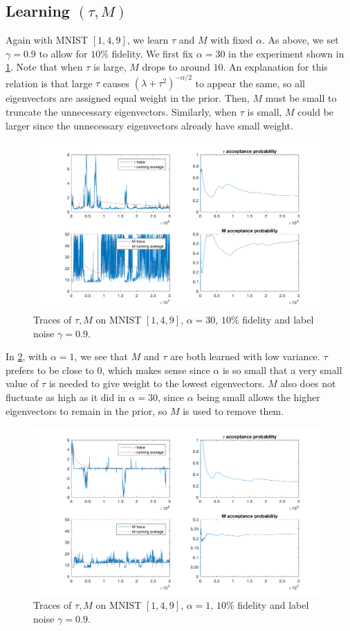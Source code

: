 \documentclass{siamart1116}
\begin{document}
    \subsection{Learning $(\tau, M)$}
        Again with MNIST $[1, 4, 9]$, we learn $\tau$ and $M$ with fixed $\alpha$. As above, we set $\gamma = 0.9$ to allow for $10\%$ fidelity. We first fix $\alpha=30$ in the experiment shown in \cref{tM_mnist_1}. Note that when $\tau$ is large, $M$ drops to around $10$. An explanation for this relation is that large $\tau$ causes $(\lambda + \tau^2)^{-\alpha/2}$ to appear the same, so all eigenvectors are assigned equal weight in the prior. Then, $M$ must be small to truncate the unnecessary eigenvectors. Similarly, when $\tau$ is small, $M$ could be larger since the unnecessary eigenvectors already have small weight.

        \begin{figure}[!htb]
        \centering
        \caption{\label{tM_mnist_1}Traces of $\tau, M$ on MNIST $[1, 4, 9]$, $\alpha = 30$, $10\%$ fidelity and label noise $\gamma = 0.9$.}
        \includegraphics[width=0.8\linewidth]{choose_hyp/t_M/alpha=30.png}
        \end{figure}

        In \cref{tM_mnist_2}, with $\alpha=1$, we see that $M$ and $\tau$ are both learned with low variance. $\tau$ prefers to be close to $0$, which makes sense since $\alpha$ is so small that a very small value of $\tau$ is needed to give weight to the lowest eigenvectors. $M$ also does not fluctuate as high as it did in $\alpha=30$, since $\alpha$ being small allows the higher eigenvectors to remain in the prior, so $M$ is used to remove them.

        \begin{figure}[!htb]
        \centering
        \caption{\label{tM_mnist_2}Traces of $\tau, M$ on MNIST $[1, 4, 9]$, $\alpha = 1$, $10\%$ fidelity and label noise $\gamma = 0.9$.}
        \includegraphics[width=0.8\linewidth]{choose_hyp/t_M/alpha=1.png}
        \end{figure}
\end{document}
